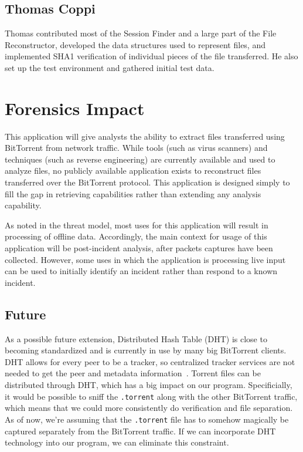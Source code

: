 \documentclass{acm_proc_article-sp}
\begin{document}
\subsection{Thomas Coppi}
Thomas contributed most of the Session Finder and a large part of the File
Reconstructor, developed the data structures used to represent files,
and implemented SHA1 verification of individual pieces of the file transferred.
He also set up the test environment and gathered initial test data.

\section{Forensics Impact}
This application will give analysts the ability to extract files transferred
using BitTorrent from network traffic. While tools (such as virus scanners) and
techniques (such as reverse engineering) are currently available and used to
analyze files, no publicly available application exists to reconstruct files
transferred over the BitTorrent protocol. This application is designed simply to
fill the gap in retrieving capabilities rather than extending any analysis
capability.

As noted in the threat model, most uses for this application will result in
processing of offline data. Accordingly, the main context for usage of this
application will be post-incident analysis, after packets captures have been
collected. However, some uses in which the application is processing live input
can be used to initially identify an incident rather than respond to a known
incident.

\subsection{Future}
As a possible future extension, Distributed Hash Table (DHT) is close to
becoming standardized and is currently in use by many big BitTorrent clients.
DHT allows for every peer to be a tracker, so centralized tracker services are
not needed to get the peer and metadata information~\cite{dhtext}. Torrent files
can be distributed through DHT, which has a big impact on our program.
Specificially, it would be possible to sniff the \texttt{.torrent} along with
the other BitTorrent traffic, which means that we could more consistently do
verification and file separation. As of now, we're assuming that the
\texttt{.torrent} file has to somehow magically be captured separately from the
BitTorrent traffic.  If we can incorporate DHT technology into our program, we
can eliminate this constraint.
\end{document}
